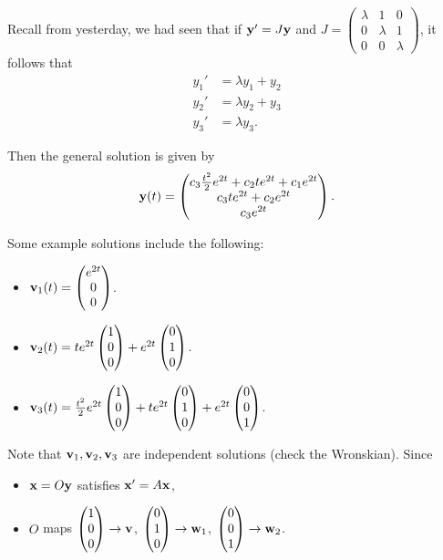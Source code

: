 \documentclass{article}
\newcommand{\mat}[1]{\begin{pmatrix}#1\end{pmatrix}}
\begin{document}
Recall from yesterday, we had seen that if $\mathbf{y}' = J \mathbf{y}$ and $J = \mat{\lambda & 1 & 0 \\ 0 & \lambda & 1 \\ 0 & 0 & \lambda}$, it follows that
\begin{align*}
  y_1' &= \lambda y_1 + y_2 \\ 
  y_2' &= \lambda y_2 + y_3 \\
  y_3' &= \lambda y_3.
\end{align*}

Then the general solution is given by
\begin{align*}
  \mbf{y}(t) = \mat{c_3 \frac{t^2}{2} e^{2t} + c_2 t e^{2t} + c_1 e^{2t} \\ c_3 t e^{2t} + c_2 e^{2t} \\ c_3 e^{2t}}.
\end{align*}

Some example solutions include the following:
\begin{itemize}
  \item $\mbf{v}_1(t) = \mat{e^{2t} \\ 0 \\ 0}$.
  \item $\mbf{v}_2(t) = t e^{2t} \mat{ 1 \\ 0 \\ 0} + e^{2t} \mat{0 \\ 1 \\ 0}$.
  \item $\mbf{v}_3(t) = \frac{t^2}{2} e^{2t} \mat{1 \\ 0 \\ 0} + t e^{2t} \mat{0 \\ 1 \\ 0} + e^{2t} \mat{0 \\ 0 \\ 1}$.
\end{itemize}

Note that $\mathbf{v}_1, \mathbf{v}_2, \mathbf{v}_3$ are independent solutions (check the Wronskian).  Since 

\begin{itemize}
  \item $\mathbf{x} = O \mathbf{y}$ satisfies $\mathbf{x}' = A \mathbf{x}$, 
  \item $O$ maps $\mat{1 \\ 0 \\ 0} \to \mbf{v}$, $\mat{0 \\ 1 \\ 0} \to \mbf{w}_1$, $\mat{0 \\ 0 \\ 1} \to \mbf{w}_2$. 
\end{itemize}
\end{document}
